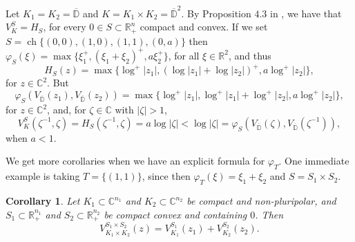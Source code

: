 \documentclass[a4paper,12pt,leqno,english]{article}
\numberwithin{equation}{section}
\newtheorem{corollary+}  [theorem+]  {Corollary}
\newenvironment{corollary}{\begin{corollary+}\sl}{\end{corollary+}\rm}
\begin{document}
Let $K_1 = K_2 = \overline{\mathbb{D}}$ and $K = K_1 \times K_2 = \overline{\mathbb{D}}^2$.
By Proposition $4.3$ in \cite{MagSigSigSno:2023}, we have that $V^S_K = H_S$, for every $0 \in S \subset \mathbb{R}_+^n$ compact and convex.
If we set $S = \operatorname{ch}\{(0, 0), (1, 0), (1, 1), (0, a)\}$ then $\varphi_S(\xi) = \max\{\xi_1^+, (\xi_1 + \xi_2)^+, a\xi_2^+\}$,
    for all $\xi \in \mathbb{R}^2$, and thus
\begin{equation*}
    H_S(z)
    =
    \max\{\log^+|z_1|, (\log|z_1| + \log|z_2|)^+, a\log^+|z_2|\},
\end{equation*}
for $z \in \mathbb{C}^2$.
But
\begin{equation*}
    \varphi_S(V_{\overline{\mathbb{D}}}(z_1), V_{\overline{\mathbb{D}}}(z_2))
    =
    \max\{\log^+|z_1|, \log^+|z_1| + \log^+|z_2|, a\log^+|z_2|\},
\end{equation*}
for $z \in \mathbb{C}^2$, and, for $\zeta \in \mathbb{C}$ with $|\zeta| > 1$,
\begin{equation*}
    V^S_K(\zeta^{-1}, \zeta)
    =
    H_S(\zeta^{-1}, \zeta)
    =
    a \log |\zeta|
    <
    \log |\zeta|
    =
    \varphi_S(V_{\overline{\mathbb{D}}}(\zeta), V_{\overline{\mathbb{D}}}(\zeta^{-1})),
\end{equation*}
when $a < 1$.

We get more corollaries when we have an explicit formula for $\varphi_T$.
One immediate example is taking $T = \{(1, 1)\}$, since then $\varphi_T(\xi) = \xi_1 + \xi_2$ and $S = S_1 \times S_2$.
\begin{corollary}
Let
    $K_1 \subset \mathbb{C}^{n_1}$ and $K_2 \subset \mathbb{C}^{n_2}$ be compact and non-pluripolar, and
    $S_1 \subset \mathbb{R}_+^{n_1}$ and $S_2 \subset \mathbb{R}_+^{n_2}$ be compact convex and containing $0$.
Then
\begin{equation*}
    V^{S_1 \times S_2}_{K_1 \times K_2}(z)
    =
    V^{S_1}_{K_1}(z_1) + V^{S_2}_{K_2}(z_2).
\end{equation*}
\end{corollary}
\end{document}
